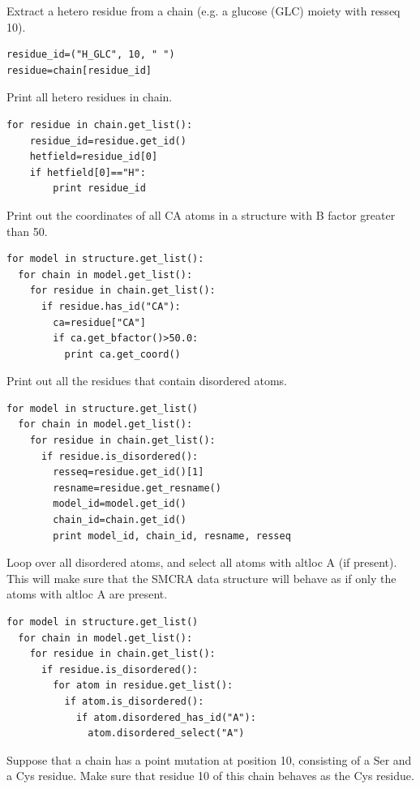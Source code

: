 \documentclass{report}
\begin{document}
Extract a hetero residue from a chain (e.g. a glucose (GLC) moiety with resseq
10).

\begin{verbatim}
residue_id=("H_GLC", 10, " ")
residue=chain[residue_id]
\end{verbatim}

Print all hetero residues in chain.

\begin{verbatim}
for residue in chain.get_list():
	residue_id=residue.get_id()
	hetfield=residue_id[0]
	if hetfield[0]=="H":
		print residue_id
\end{verbatim}

Print out the coordinates of all CA atoms in a structure with B factor greater
than 50. 

\begin{verbatim}
for model in structure.get_list():
  for chain in model.get_list():
    for residue in chain.get_list():
      if residue.has_id("CA"):
        ca=residue["CA"]
        if ca.get_bfactor()>50.0:
          print ca.get_coord()
\end{verbatim}

Print out all the residues that contain disordered atoms.

\begin{verbatim}
for model in structure.get_list()
  for chain in model.get_list():
    for residue in chain.get_list():
      if residue.is_disordered():
        resseq=residue.get_id()[1]
        resname=residue.get_resname()
        model_id=model.get_id()
        chain_id=chain.get_id()
        print model_id, chain_id, resname, resseq
\end{verbatim}

Loop over all disordered atoms, and select all atoms with altloc A (if present).
This will make sure that the SMCRA data structure will behave as if only the
atoms with altloc A are present. 

\begin{verbatim}
for model in structure.get_list()
  for chain in model.get_list():
    for residue in chain.get_list():
      if residue.is_disordered():
        for atom in residue.get_list():
          if atom.is_disordered():
            if atom.disordered_has_id("A"):
              atom.disordered_select("A")
\end{verbatim}

Suppose that a chain has a point mutation at position 10, consisting of a Ser
and a Cys residue. Make sure that residue 10 of this chain behaves as the Cys
residue.
\end{document}
